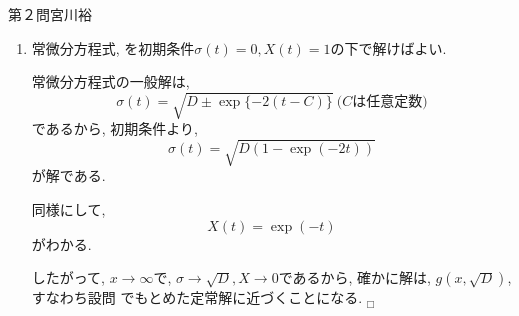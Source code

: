 \documentclass[fleqn]{jbook}
\begin{document}
\begin{answer}{第２問}{宮川裕}
\begin{enumerate}
\item
  常微分方程式, を初期条件$\sigma(t)=0,X(t)=1$の下で解けばよい. 

  常微分方程式の一般解は, 
  \begin{equation}
    \sigma(t)=\sqrt{D \pm \exp \{-2(t-C)\}} \ \text{($C$は任意定数)}
  \end{equation}
  であるから, 初期条件より, 
  \begin{equation}
    \sigma(t)=\sqrt{D(1-\exp(-2t))}
  \end{equation}
  が解である. 

  同様にして, 
  \begin{equation}
    X(t)=\exp(-t)
  \end{equation}
  がわかる. 

  したがって, $x \rightarrow \infty$で, $\sigma \rightarrow \sqrt{D},X \rightarrow 0$であるから, 
  確かに解は, $g(x,\sqrt{D})$, すなわち設問 でもとめた定常解に近づくことになる. $_\Box$
\end{enumerate}
\end{answer}
\end{document}
